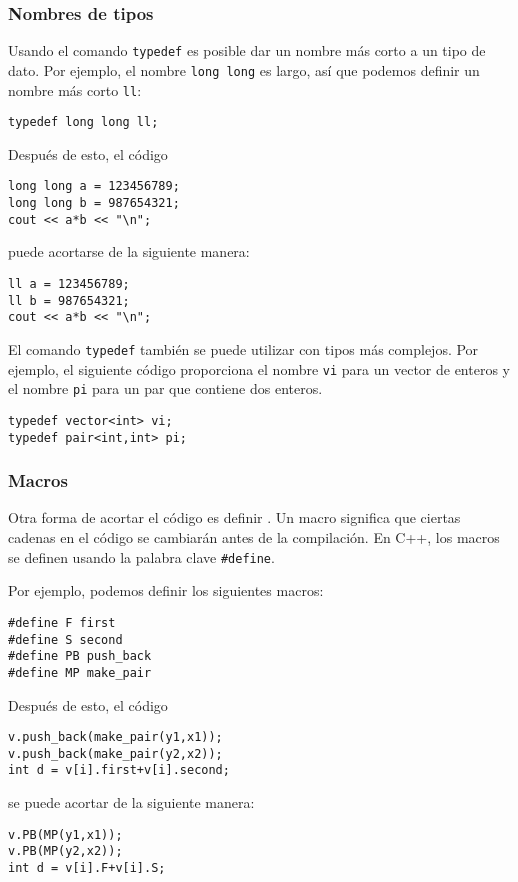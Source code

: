 \subsubsection{Nombres de tipos}
Usando el comando \texttt{typedef}
es posible dar un nombre más corto
a un tipo de dato.
Por ejemplo, el nombre \texttt{long long} es largo,
así que podemos definir un nombre más corto \texttt{ll}:
\begin{lstlisting}
typedef long long ll;
\end{lstlisting}
Después de esto, el código
\begin{lstlisting}
long long a = 123456789;
long long b = 987654321;
cout << a*b << "\n";
\end{lstlisting}
puede acortarse de la siguiente manera:
\begin{lstlisting}
ll a = 123456789;
ll b = 987654321;
cout << a*b << "\n";
\end{lstlisting}

El comando \texttt{typedef}
también se puede utilizar con tipos más complejos.
Por ejemplo, el siguiente código proporciona
el nombre \texttt{vi} para un vector de enteros
y el nombre \texttt{pi} para un par
que contiene dos enteros.
\begin{lstlisting}
typedef vector<int> vi;
typedef pair<int,int> pi;
\end{lstlisting}

\subsubsection{Macros}
Otra forma de acortar el código es definir
.
Un macro significa que ciertas cadenas en
el código se cambiarán antes de la compilación.
En C++, los macros se definen usando la
palabra clave \texttt{\#define}.

Por ejemplo, podemos definir los siguientes macros:
\begin{lstlisting}
#define F first
#define S second
#define PB push_back
#define MP make_pair
\end{lstlisting}
Después de esto, el código
\begin{lstlisting}
v.push_back(make_pair(y1,x1));
v.push_back(make_pair(y2,x2));
int d = v[i].first+v[i].second;
\end{lstlisting}
se puede acortar de la siguiente manera:
\begin{lstlisting}
v.PB(MP(y1,x1));
v.PB(MP(y2,x2));
int d = v[i].F+v[i].S;
\end{lstlisting}

